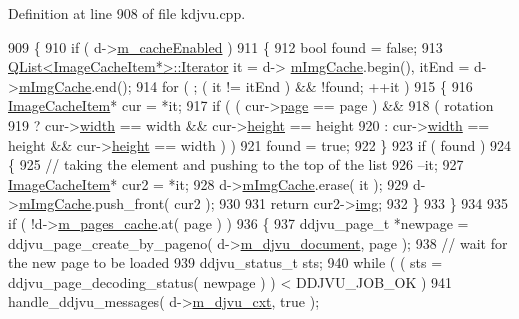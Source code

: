 Definition at line 908 of file kdjvu.\+cpp.


\begin{DoxyCode}
909 \{
910     \textcolor{keywordflow}{if} ( d->\hyperlink{classKDjVu_1_1Private_a61eaa61e0d4e31a7e411a481df9827ee}{m\_cacheEnabled} )
911     \{
912     \textcolor{keywordtype}{bool} found = \textcolor{keyword}{false};
913     \hyperlink{classQList}{QList<ImageCacheItem*>::Iterator} it = d->
      \hyperlink{classKDjVu_1_1Private_a447ca81b4cc0237ac52aa8bfadd1258e}{mImgCache}.begin(), itEnd = d->\hyperlink{classKDjVu_1_1Private_a447ca81b4cc0237ac52aa8bfadd1258e}{mImgCache}.end();
914     \textcolor{keywordflow}{for} ( ; ( it != itEnd ) && !found; ++it )
915     \{
916         \hyperlink{classImageCacheItem}{ImageCacheItem}* cur = *it;
917         \textcolor{keywordflow}{if} ( ( cur->\hyperlink{classImageCacheItem_aa3d72c87b3f029cc5b284f68a48252c6}{page} == page ) &&
918              ( rotation %
919                ? cur->\hyperlink{classImageCacheItem_a1481bdd684cf00f3f895302ad8b65720}{width} == width && cur->\hyperlink{classImageCacheItem_a5b8016e759dfeab649311a6af44f6c34}{height} == height
920                : cur->\hyperlink{classImageCacheItem_a1481bdd684cf00f3f895302ad8b65720}{width} == height && cur->\hyperlink{classImageCacheItem_a5b8016e759dfeab649311a6af44f6c34}{height} == width ) )
921             found = \textcolor{keyword}{true};
922     \}
923     \textcolor{keywordflow}{if} ( found )
924     \{
925         \textcolor{comment}{// taking the element and pushing to the top of the list}
926         --it;
927         \hyperlink{classImageCacheItem}{ImageCacheItem}* cur2 = *it;
928         d->\hyperlink{classKDjVu_1_1Private_a447ca81b4cc0237ac52aa8bfadd1258e}{mImgCache}.erase( it );
929         d->\hyperlink{classKDjVu_1_1Private_a447ca81b4cc0237ac52aa8bfadd1258e}{mImgCache}.push\_front( cur2 );
930 
931         \textcolor{keywordflow}{return} cur2->\hyperlink{classImageCacheItem_a4c12636231b58e37862371b73eceef9a}{img};
932     \}
933     \}
934 
935     \textcolor{keywordflow}{if} ( !d->\hyperlink{classKDjVu_1_1Private_a7c2361a6591fe13e69bc7982a3efd780}{m\_pages\_cache}.at( page ) )
936     \{
937         ddjvu\_page\_t *newpage = ddjvu\_page\_create\_by\_pageno( d->\hyperlink{classKDjVu_1_1Private_a183f9508738c71bb5abab150619a5ccd}{m\_djvu\_document}, page );
938         \textcolor{comment}{// wait for the new page to be loaded}
939         ddjvu\_status\_t sts;
940         \textcolor{keywordflow}{while} ( ( sts = ddjvu\_page\_decoding\_status( newpage ) ) < DDJVU\_JOB\_OK )
941             handle\_ddjvu\_messages( d->\hyperlink{classKDjVu_1_1Private_a5a52150a7ab9bbd584d6d73d68ae9ba1}{m\_djvu\_cxt}, \textcolor{keyword}{true} );

\end{DoxyCode}
